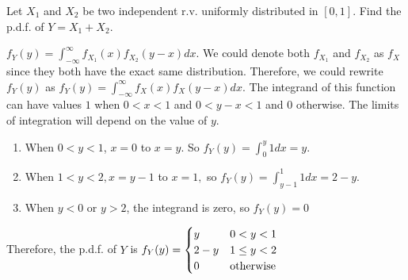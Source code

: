 \documentclass[letterpaper,12pt,addpoints]{exam}
\begin{document}
\begin{questions}
\vspace*{\fill}\eject

\question[15]
Let $X_1$ and $X_2$ be two independent r.v. uniformly distributed in $[0,1]$. 
Find the p.d.f. of $Y=X_1+X_2$.

\begin{solution}
$f_Y(y)=\int_{-\infty}^{\infty}f_{X_1}(x)f_{X_2}(y-x)dx.$ We could denote both $f_{X_1}$ and $f_{X_2}$ as $f_X$ since they both have the exact same distribution. Therefore, we could rewrite $f_Y(y)$ as $f_Y(y)=\int_{-\infty}^{\infty}f_X(x)f_X(y-x)dx.$ The integrand of this function can have values $1$ when $0<x<1$ and $0<y-x<1$ and $0$ otherwise. The limits of integration will depend on the value of $y.$
\begin{enumerate}
    \item 
    
    When $0<y<1$, $x=0$ to $x=y$. So $f_Y(y)=\int_0^y1dx=y.$
    
    \item
    
    When $1<y<2,x=y-1$ to $x=1,$  so $f_Y(y)=\int_{y-1}^1 1dx=2-y.$
    
    \item
    
    When $y<0$ or $y>2$, the integrand is zero, so $f_Y(y)=0$
    
\end{enumerate}
Therefore, the p.d.f. of $Y$ is $f_Y(y)=\begin{cases}
 y&0<y<1\crcr
 2-y&1\leq y<2\crcr
 0&\text{otherwise}
\end{cases}$
\end{solution}

\end{questions}
\end{document}
